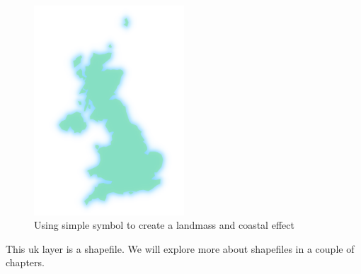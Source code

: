 \begin{figure}[!h]
	\centering
	\includegraphics[width=0.5\textwidth]{images/uk_with_coast.png}
	\caption{Using simple symbol to create a landmass and coastal effect}
	\label{ft_fig_firstfig3}
\end{figure}

This uk layer is a shapefile. We will explore more about shapefiles in a couple of chapters.